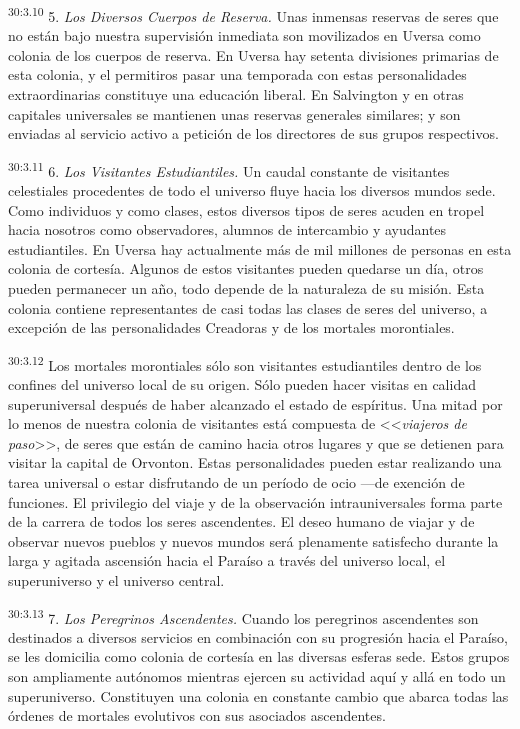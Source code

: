 \par
\textsuperscript{30:3.10} 5. \textit{Los Diversos Cuerpos de Reserva.} Unas inmensas reservas de seres que no están bajo nuestra supervisión inmediata son movilizados en Uversa como colonia de los cuerpos de reserva. En Uversa hay setenta divisiones primarias de esta colonia, y el permitiros pasar una temporada con estas personalidades extraordinarias constituye una educación liberal. En Salvington y en otras capitales universales se mantienen unas reservas generales similares; y son enviadas al servicio activo a petición de los directores de sus grupos respectivos.

\par
\textsuperscript{30:3.11} 6. \textit{Los Visitantes Estudiantiles.} Un caudal constante de visitantes celestiales procedentes de todo el universo fluye hacia los diversos mundos sede. Como individuos y como clases, estos diversos tipos de seres acuden en tropel hacia nosotros como observadores, alumnos de intercambio y ayudantes estudiantiles. En Uversa hay actualmente más de mil millones de personas en esta colonia de cortesía. Algunos de estos visitantes pueden quedarse un día, otros pueden permanecer un año, todo depende de la naturaleza de su misión. Esta colonia contiene representantes de casi todas las clases de seres del universo, a excepción de las personalidades Creadoras y de los mortales morontiales.

\par
\textsuperscript{30:3.12} Los mortales morontiales sólo son visitantes estudiantiles dentro de los confines del universo local de su origen. Sólo pueden hacer visitas en calidad superuniversal después de haber alcanzado el estado de espíritus. Una mitad por lo menos de nuestra colonia de visitantes está compuesta de <<\textit{viajeros de paso}>>, de seres que están de camino hacia otros lugares y que se detienen para visitar la capital de Orvonton. Estas personalidades pueden estar realizando una tarea universal o estar disfrutando de un período de ocio ---de exención de funciones. El privilegio del viaje y de la observación intrauniversales forma parte de la carrera de todos los seres ascendentes. El deseo humano de viajar y de observar nuevos pueblos y nuevos mundos será plenamente satisfecho durante la larga y agitada ascensión hacia el Paraíso a través del universo local, el superuniverso y el universo central.

\par
\textsuperscript{30:3.13} 7. \textit{Los Peregrinos Ascendentes.} Cuando los peregrinos ascendentes son destinados a diversos servicios en combinación con su progresión hacia el Paraíso, se les domicilia como colonia de cortesía en las diversas esferas sede. Estos grupos son ampliamente autónomos mientras ejercen su actividad aquí y allá en todo un superuniverso. Constituyen una colonia en constante cambio que abarca todas las órdenes de mortales evolutivos con sus asociados ascendentes.

